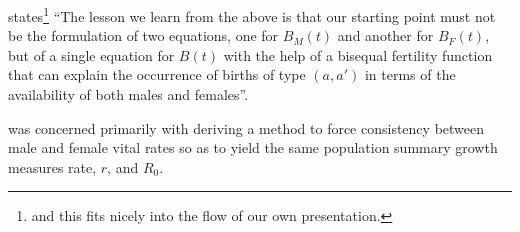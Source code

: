 
\citet{gupta1978alternative} states\footnote{and this fits nicely into the flow
of our own presentation.} ``The lesson we learn from the above is that our
starting point must not be the formulation of two equations, one for $B_M(t)$ and another for
$B_F(t)$, but of a single equation for $B(t)$ with the help of a bisequal
fertility function that can explain the occurrence of births of type $(a,a')$ in
terms of the availability of both males and females''.


\citet{gupta1972two, gupta1973growth, gupta1976interactive, gupta1978alternative}
was concerned primarily with deriving a method to force consistency between male and female
vital rates so as to yield the same population summary growth measures rate,
$r$, and $R_0$.





